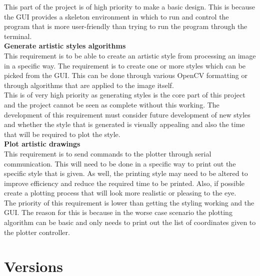 \documentclass{article}
\begin{document}
This part of the project is of high priority to make a basic design. This is because the GUI provides a skeleton environment in which to run and control the program that is more user-friendly than trying to run the program through the terminal.
\\ \newline
\clearpage
\textbf{Generate artistic styles algorithms}\\ \newline
This requirement is to be able to create an artistic style from processing an image in a specific way. The requirement is to create one or more styles which can be picked from the GUI. This can be done through various OpenCV formatting or through algorithms that are applied to the image itself.\\ \newline
This is of very high priority as generating styles is the core part of this project and the project cannot be seen as complete without this working. The development of this requirement must consider future development of new styles and whether the style that is generated is visually appealing and also the time that will be required to plot the style.
\\ \newline
\textbf{Plot artistic drawings}\\ \newline
This requirement is to send commands to the plotter through serial communication. This will need to be done in a specific way to print out the specific style that is given. As well, the printing style may need to be altered to improve efficiency and reduce the required time to be printed. Also, if possible create a plotting process that will look more realistic or pleasing to the eye.\\ \newline
The priority of this requirement is lower than getting the styling working and the GUI. The reason for this is because in the worse case scenario the plotting algorithm can be basic and only needs to print out the list of coordinates given to the plotter controller.\\ \newline 

    \section{Versions}
\end{document}
